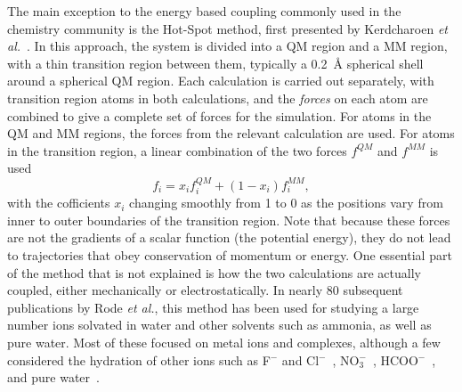 \documentclass[11pt]{revtex4}
\begin{document}
The main exception to the energy based coupling commonly used in
the chemistry community is the Hot-Spot method, first presented by
Kerdcharoen {\it et al.}~\cite{kerdcharoen_chem_phys_1996a}.  In
this approach, the system is divided into a QM region and a MM
region, with a thin transition region between them, typically a
0.2~{\AA} spherical shell around a spherical QM region.  Each
calculation is carried out separately, with transition region atoms
in both calculations, and the {\em forces} on each atom are combined
to give a complete set of forces for the simulation.   For atoms
in the QM and MM regions, the forces from the relevant calculation are used.
For atoms in the transition region, a linear combination of the two
forces $f^{QM}$ and $f^{MM}$ is used
$$f_i = x_i f_i^{QM} + (1-x_i) f_i^{MM},$$
with the cofficients $x_i$ changing smoothly from 1 to 0
as the positions vary from inner to outer boundaries of the transition
region.  Note that because these forces are not the gradients of a scalar
function (the potential energy), they do not lead to trajectories that
obey conservation of momentum or energy.  One essential part of the method
that is not explained is how the two calculations are actually coupled,
either mechanically or electrostatically.  In
nearly 80 subsequent publications by Rode {\it et al.}, this method
has been used for studying a large number ions solvated in water
and other solvents such as ammonia, as well as pure water.  Most
of these focused on metal ions and complexes, although a few
considered the hydration of other ions such as F$^-$ and
Cl$^-$~\cite{tongraar_phys_chem_chem_phys_2003a,tongraar_chem_phys_lett_2005a},
NO$_3^-$~\cite{tongraar_j_phys_chem_a_2006a},
HCOO$^-$~\cite{payaka_j_phys_chem_a_2009a}, and pure
water~\cite{xenides_j_chem_phys_2005a,xenides_j_mol_liq_2006a}.
\end{document}

